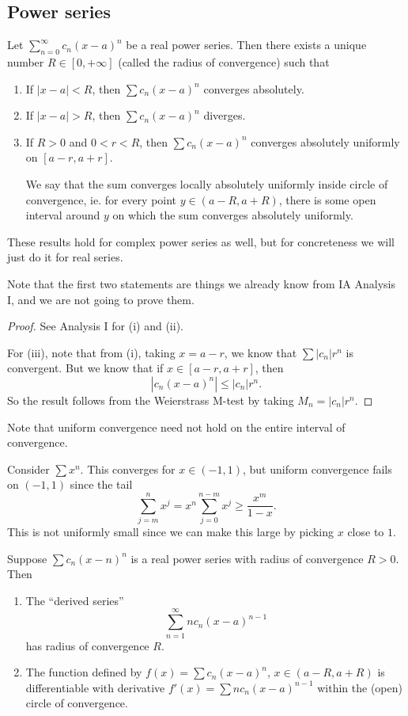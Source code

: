 \documentclass[a4paper]{article}
\begin{document}
\subsection{Power series}
\begin{thm}[]
  Let $\sum\limits_{n = 0}^\infty c_n (x - a)^n$ be a real power series. Then there exists a unique number $R\in [0, +\infty]$ (called the radius of convergence) such that
  \begin{enumerate}
    \item If $|x - a| < R$, then $\sum c_n (x - a)^n$ converges absolutely.
    \item If $|x - a| > R$, then $\sum c_n (x - a)^n$ diverges.
    \item If $R > 0$ and $0 < r < R$, then $\sum c_n (x - a)^n$ converges absolutely uniformly on $[a - r, a + r]$.

      We say that the sum converges locally absolutely uniformly inside circle of convergence, ie. for every point $y\in (a - R, a + R)$, there is some open interval around $y$ on which the sum converges absolutely uniformly.
  \end{enumerate}
  These results hold for complex power series as well, but for concreteness we will just do it for real series.
\end{thm}
Note that the first two statements are things we already know from IA Analysis I, and we are not going to prove them.
\begin{proof}
  See Analysis I for (i) and (ii).

  For (iii), note that from (i), taking $x = a - r$, we know that $\sum |c_n| r^n$ is convergent. But we know that if $x\in [a - r, a + r]$, then
  \[
    |c_n (x - a)^n| \leq |c_n| r^n.
  \]
  So the result follows from the Weierstrass M-test by taking $M_n = |c_n| r^n$.
\end{proof}
Note that uniform convergence need not hold on the entire interval of convergence.
\begin{eg}
  Consider $\sum x^n$. This converges for $x\in (-1, 1)$, but uniform convergence fails on $(-1, 1)$ since the tail
  \[
    \sum_{j = m}^n x^j = x^n \sum_{j = 0}^{n - m} x^j \geq \frac{x^m}{1 - x}.
  \]
  This is not uniformly small since we can make this large by picking $x$ close to $1$.
\end{eg}

\begin{thm}
  Suppose $\sum c_n (x - n)^n$ is a real power series with radius of convergence $R > 0$. Then
  \begin{enumerate}
    \item The ``derived series''
      \[
        \sum_{n = 1}^\infty n c_n (x - a)^{n - 1}
      \]
      has radius of convergence $R$.
    \item The function defined by $f(x) = \sum c_n (x - a)^n$, $x\in (a - R, a + R)$ is differentiable with derivative $f'(x) = \sum n c_n (x - a)^{n - 1}$ within the (open) circle of convergence.
  \end{enumerate}
\end{thm}
\end{document}
